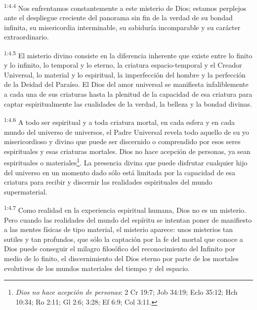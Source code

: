 \par
\textsuperscript{1:4.4} Nos enfrentamos constantemente a este misterio de Dios; estamos perplejos ante el despliegue creciente del panorama sin fin de la verdad de su bondad infinita, su misericordia interminable, su sabiduría incomparable y su carácter extraordinario.

\par
\textsuperscript{1:4.5} El misterio divino consiste en la diferencia inherente que existe entre lo finito y lo infinito, lo temporal y lo eterno, la criatura espacio-temporal y el Creador Universal, lo material y lo espiritual, la imperfección del hombre y la perfección de la Deidad del Paraíso. El Dios del amor universal se manifiesta infaliblemente a cada una de sus criaturas hasta la plenitud de la capacidad de esa criatura para captar espiritualmente las cualidades de la verdad, la belleza y la bondad divinas.

\par
\textsuperscript{1:4.6} A todo ser espiritual y a toda criatura mortal, en cada esfera y en cada mundo del universo de universos, el Padre Universal revela todo aquello de su yo misericordioso y divino que puede ser discernido o comprendido por esos seres espirituales y esas criaturas mortales. Dios no hace acepción de personas, ya sean espirituales o materiales\footnote{\textit{Dios no hace acepción de personas}: 2 Cr 19:7; Job 34:19; Eclo 35:12; Hch 10:34; Ro 2:11; Gl 2:6; 3:28; Ef 6:9; Col 3:11.}. La presencia divina que puede disfrutar cualquier hijo del universo en un momento dado sólo está limitada por la capacidad de esa criatura para recibir y discernir las realidades espirituales del mundo supermaterial.

\par
\textsuperscript{1:4.7} Como realidad en la experiencia espiritual humana, Dios no es un misterio. Pero cuando las realidades del mundo del espíritu se intentan poner de manifiesto a las mentes físicas de tipo material, el misterio aparece: unos misterios tan sutiles y tan profundos, que sólo la captación por la fe del mortal que conoce a Dios puede conseguir el milagro filosófico del reconocimiento del Infinito por medio de lo finito, el discernimiento del Dios eterno por parte de los mortales evolutivos de los mundos materiales del tiempo y del espacio.


